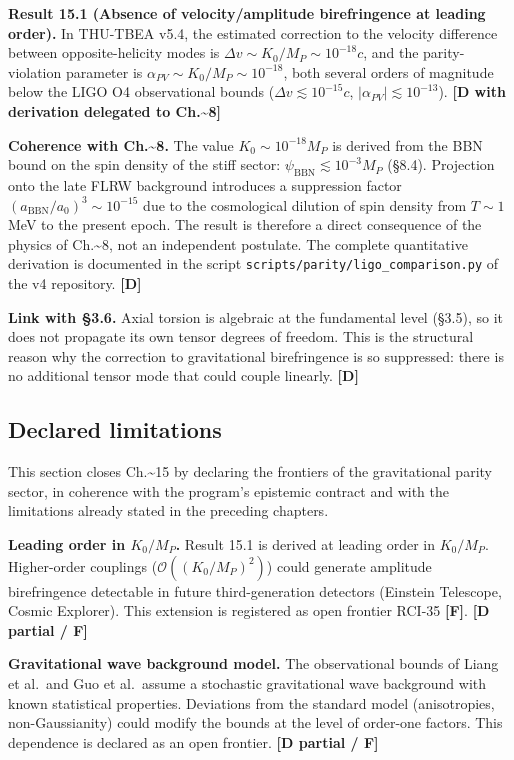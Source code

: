 ﻿\documentclass[11pt,letterpaper]{article}
\begin{document}
\textbf{Result 15.1 (Absence of velocity/amplitude birefringence at leading order).} In THU-TBEA v5.4, the estimated correction to the velocity difference between opposite-helicity modes is $\Delta v \sim K_0/M_P \sim 10^{-18}c$, and the parity-violation parameter is $\alpha_{PV} \sim K_0/M_P \sim 10^{-18}$, both several orders of magnitude below the LIGO O4 observational bounds ($\Delta v \lesssim 10^{-15}c$, $|\alpha_{PV}| \lesssim 10^{-13}$). \textbf{[D with derivation delegated to Ch.\textasciitilde{}8]}

\textbf{Coherence with Ch.\textasciitilde{}8.} The value $K_0 \sim 10^{-18}M_P$ is derived from the BBN bound on the spin density of the stiff sector: $\psi_{\text{BBN}} \lesssim 10^{-3}M_P$ (§8.4). Projection onto the late FLRW background introduces a suppression factor $(a_{\text{BBN}}/a_0)^3 \sim 10^{-15}$ due to the cosmological dilution of spin density from $T \sim 1$ MeV to the present epoch. The result is therefore a direct consequence of the physics of Ch.\textasciitilde{}8, not an independent postulate. The complete quantitative derivation is documented in the script \texttt{scripts/parity/ligo\_comparison.py} of the v4 repository. \textbf{[D]}

\textbf{Link with §3.6.} Axial torsion is algebraic at the fundamental level (§3.5), so it does not propagate its own tensor degrees of freedom. This is the structural reason why the correction to gravitational birefringence is so suppressed: there is no additional tensor mode that could couple linearly. \textbf{[D]}
\subsection{Declared limitations}
This section closes Ch.\textasciitilde{}15 by declaring the frontiers of the gravitational parity sector, in coherence with the program's epistemic contract and with the limitations already stated in the preceding chapters.

\textbf{Leading order in $K_0/M_P$.} Result 15.1 is derived at leading order in $K_0/M_P$. Higher-order couplings ($\mathcal{O}((K_0/M_P)^2)$) could generate amplitude birefringence detectable in future third-generation detectors (Einstein Telescope, Cosmic Explorer). This extension is registered as open frontier RCI-35 \textbf{[F]}. \textbf{[D partial / F]}

\textbf{Gravitational wave background model.} The observational bounds of Liang et al.\ and Guo et al.\ assume a stochastic gravitational wave background with known statistical properties. Deviations from the standard model (anisotropies, non-Gaussianity) could modify the bounds at the level of order-one factors. This dependence is declared as an open frontier. \textbf{[D partial / F]}
\end{document}
